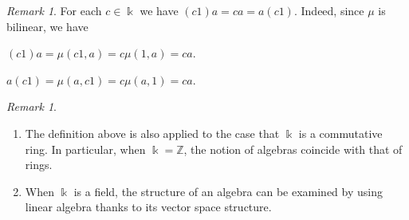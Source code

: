 \documentclass{surv-l}
\numberwithin{equation}{chapter}
\numberwithin{figure}{chapter}
\theoremstyle{plain}
\theoremstyle{definition}
\theoremstyle{remark}
\newtheorem{rmk}[thm]{Remark}
\begin{document}
\begin{rmk}
For each $c \in \Bbbk$ we have $(c1)a = ca = a(c1)$.
Indeed,
since $\mu$ is bilinear, we have

$(c1)a =\mu(c1,a) = c\mu(1,a) =ca$.

$a(c1)=\mu(a,c1) = c\mu(a,1) = ca$.
\end{rmk}

\begin{rmk}
\leavevmode
\begin{enumerate}[wide]
\item The definition above is also applied to the case that $\Bbbk$ is a commutative ring.
In particular, when $\Bbbk = \mathbb{Z}$, the notion of algebras coincide with that of rings.
\item When $\Bbbk$ is a field,
the structure of an algebra can be examined by using linear algebra
thanks to its vector space structure.
\end{enumerate}
\end{rmk}
\end{document}
